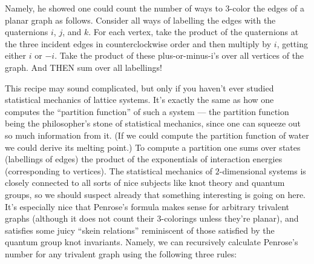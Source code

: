 \documentclass{article}
\begin{document}
Namely, he showed one could count the number of ways to 3-color the
edges of a planar graph as follows. Consider all ways of labelling the
edges with the quaternions \(i\), \(j\), and \(k\). For each vertex,
take the product of the quaternions at the three incident edges in
counterclockwise order and then multiply by \(i\), getting either \(i\)
or \(-i\). Take the product of these plus-or-minus-i's over all vertices
of the graph. And THEN sum over all labellings!

This recipe may sound complicated, but only if you haven't ever studied
statistical mechanics of lattice systems. It's exactly the same as how
one computes the ``partition function'' of such a system --- the
partition function being the philosopher's stone of statistical
mechanics, since one can squeeze out so much information from it. (If we
could compute the partition function of water we could derive its
melting point.) To compute a partition one sums over states (labellings
of edges) the product of the exponentials of interaction energies
(corresponding to vertices). The statistical mechanics of
\(2\)-dimensional systems is closely connected to all sorts of nice
subjects like knot theory and quantum groups, so we should suspect
already that something interesting is going on here. It's especially
nice that Penrose's formula makes sense for arbitrary trivalent graphs
(although it does not count their 3-colorings unless they're planar),
and satisfies some juicy ``skein relations'' reminiscent of those
satisfied by the quantum group knot invariants. Namely, we can
recursively calculate Penrose's number for any trivalent graph using the
following three rules:
\end{document}

